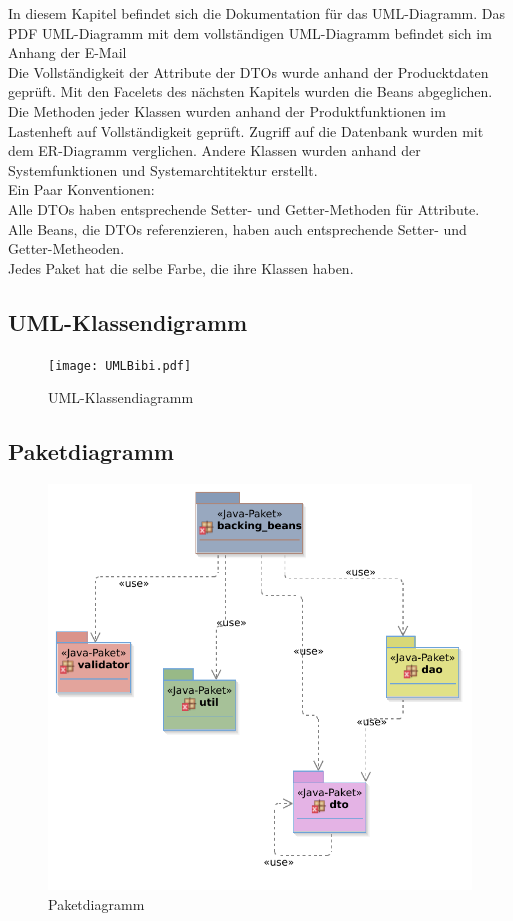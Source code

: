 \documentclass{article}
\begin{document}
In diesem Kapitel befindet sich die Dokumentation für das UML-Diagramm. Das PDF UML-Diagramm mit dem vollständigen  UML-Diagramm befindet sich im Anhang der E-Mail\\
Die Vollständigkeit der Attribute der DTOs wurde anhand der Producktdaten geprüft.
Mit den Facelets des nächsten Kapitels wurden die Beans  abgeglichen.
Die Methoden jeder Klassen wurden anhand der Produktfunktionen im Lastenheft auf Vollständigkeit geprüft. Zugriff auf die Datenbank wurden mit dem ER-Diagramm verglichen. Andere Klassen wurden anhand der Systemfunktionen und Systemarchtitektur erstellt.\\
Ein Paar Konventionen:\\
Alle DTOs haben entsprechende Setter- und Getter-Methoden für Attribute.\\
Alle Beans, die DTOs referenzieren, haben auch entsprechende Setter- und Getter-Metheoden.\\
Jedes Paket hat die selbe Farbe, die ihre Klassen haben.
\subsection{UML-Klassendigramm}

\begin{figure}[H]
    \texttt{[image: UMLBibi.pdf]}
    \caption{UML-Klassendiagramm}
    \label{fig:UML-Klassendkígrramm}
\end{figure}

\subsection{Paketdiagramm}

\begin{figure}[H]
    \centering
    \includegraphics[scale=0.5]{Paketdiagramm.pdf}
    \caption{Paketdiagramm}
    \label{fig:UML-Paketdkígrramm}
\end{figure}
\end{document}
